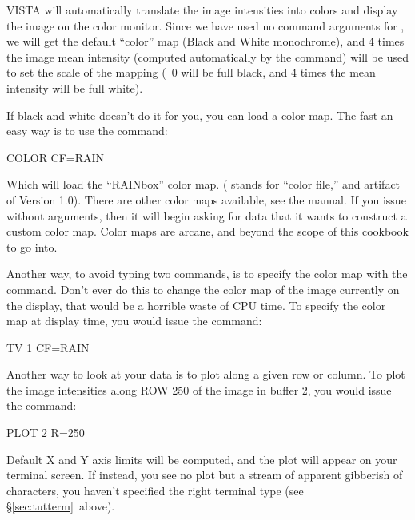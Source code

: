 {VISTA will automatically translate the image intensities into colors and
display the image on the color monitor.  Since we have used no command
arguments for , we will get the default ``color'' map (Black and
White monochrome), and 4 times the image mean intensity (computed
automatically by the  command) will be used to set the scale of the
mapping (\ie\ 0 will be full black, and 4 times the mean intensity will be
full white).

If black and white doesn't do it for you, you can load a color map.  The
fast an easy way is to use the command:

\begin{command}
      \item COLOR CF=RAIN
\end{command}

\noindent Which will load the ``RAINbox'' color map.  ( stands for
``color file,'' and artifact of Version 1.0). There are other color maps
available, see the manual.  If you issue  without arguments, then
it will begin asking for data that it wants to construct a custom color map.
Color maps are arcane, and beyond the scope of this cookbook to go into.

Another way, to avoid typing two commands, is to specify the color map with
the  command.  Don't ever do this to change the color map of the
image currently on the display, that would be a horrible waste of CPU time.
To specify the color map at display time, you would issue the command:

\begin{command}
      \item TV 1 CF=RAIN
\end{command}

\medskip

\nobreak
Another way to look at your data is to plot along a given row or column.
To plot the image intensities along ROW 250 of the image in buffer 2, you
would issue the command:

\begin{command}
    \item PLOT 2 R=250
\end{command}

\noindent
Default X and Y axis limits will be computed, and the plot will appear on your
terminal screen.  If instead, you see no plot but a stream of apparent
gibberish of characters, you haven't specified the right terminal type (see
\S\ref{sec:tutterm}\ above).

}
